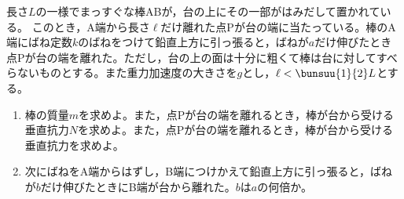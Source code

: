 \item
    \begin{mawarikomi}{150pt}{}
    長さ$L$の一様でまっすぐな棒ABが，台の上にその一部がはみだして置かれている。
    このとき，A端から長さ$\ell $だけ離れた点Pが台の端に当たっている。棒のA端にばね定数$k$のばねをつけて鉛直上方に引っ張ると，ばねが$a$だけ伸びたとき点Pが台の端を離れた。ただし，台の上の面は十分に粗くて棒は台に対してすべらないものとする。また重力加速度の大きさを$g$とし，$\ell < \bunsuu{1}{2}L$とする。
        \begin{enumerate}
            \item 棒の質量$m$を求めよ。また，点Pが台の端を離れるとき，棒が台から受ける垂直抗力$N$を求めよ。また，点Pが台の端を離れるとき，棒が台から受ける垂直抗力を求めよ。
            \item 次にばねをA端からはずし，B端につけかえて鉛直上方に引っ張ると，ばねが$b$だけ伸びたときにB端が台から離れた。$b$は$a$の何倍か。
        \end{enumerate}
    \end{mawarikomi}
